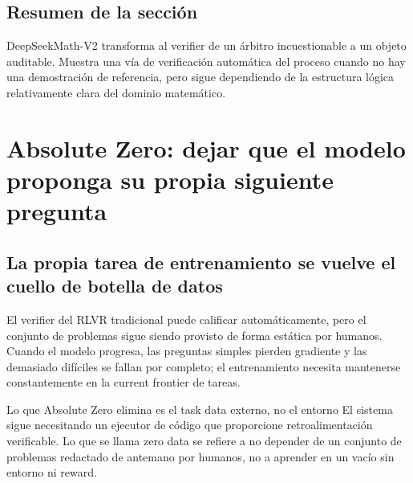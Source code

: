 \documentclass[a4paper]{article}
\begin{document}
\subsection{Resumen de la sección}

DeepSeekMath-V2 transforma al verifier de un árbitro incuestionable a un objeto auditable. Muestra una vía de verificación automática del proceso cuando no hay una demostración de referencia, pero sigue dependiendo de la estructura lógica relativamente clara del dominio matemático.
\section{Absolute Zero: dejar que el modelo proponga su propia siguiente pregunta}

\subsection{La propia tarea de entrenamiento se vuelve el cuello de botella de datos}


El verifier del RLVR tradicional puede calificar automáticamente, pero el conjunto de problemas sigue siendo provisto de forma estática por humanos. Cuando el modelo progresa, las preguntas simples pierden gradiente y las demasiado difíciles se fallan por completo; el entrenamiento necesita mantenerse constantemente en la current frontier de tareas.



\begin{importantbox}{Lo que Absolute Zero elimina es el task data externo, no el entorno}
El sistema sigue necesitando un ejecutor de código que proporcione retroalimentación verificable. Lo que se llama zero data se refiere a no depender de un conjunto de problemas redactado de antemano por humanos, no a aprender en un vacío sin entorno ni reward.
\end{importantbox}
\end{document}
